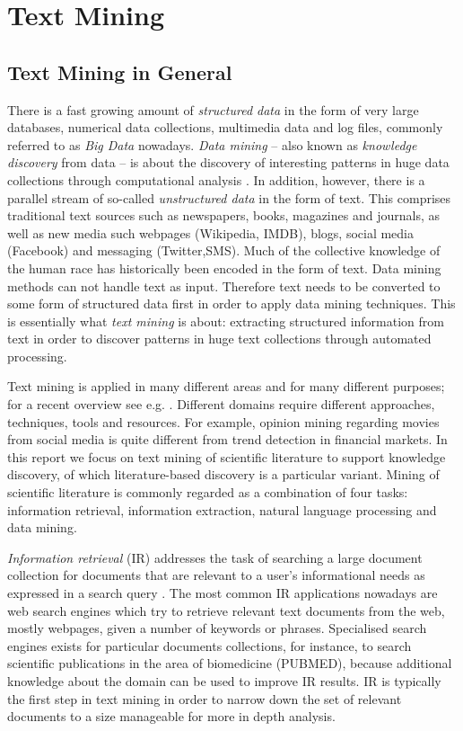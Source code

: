 
\chapter{Text Mining}

\section{Text Mining in General}

There is a fast growing amount of \emph{structured data} in the form of very large databases, numerical data collections, multimedia data and log files, commonly referred to as \emph{Big Data} nowadays.
\emph{Data mining} -- also known as \emph{knowledge discovery} from data -- is about the discovery of interesting patterns in huge data collections through computational analysis \citep{han2006data}.
In addition, however, there is a parallel stream of so-called \emph{unstructured data} in the form of text.
This comprises traditional text sources such as newspapers, books, magazines and journals, as well as new media such webpages (Wikipedia, IMDB), blogs, social media (Facebook) and messaging (Twitter,SMS).
Much of the collective knowledge of the human race has historically been encoded in the form of text. 
Data mining methods can not handle text as input.
Therefore text needs to be converted to some form of structured data first in order to apply data mining techniques.
This is essentially what \emph{text mining} is about: extracting structured information from text in order to discover patterns in huge text collections through automated processing.

Text mining is applied in many different areas and for many different purposes; for a recent overview see e.g. \citep{Aggarwal2012Mining,Weiss2012Fundamentals}.
Different domains require different approaches, techniques, tools and resources.
For example, opinion mining regarding movies from social media is quite different from trend detection in financial markets. 
In this report we focus on text mining of scientific literature to support knowledge discovery, of which literature-based discovery is a particular variant.
Mining of scientific literature is commonly regarded as a combination of four tasks: information retrieval, information extraction, natural language processing and data mining.

\emph{Information retrieval} (IR) addresses the task of searching a large document collection for documents that are relevant to a user's informational needs as expressed in a search query \citep{ManningRaghavanSchutze:08}. 
The most common IR applications nowadays are web search engines which try to retrieve relevant text documents from the web, mostly webpages, given a number of keywords or phrases.
Specialised search engines exists for particular documents collections, for instance, to search scientific publications in the area of biomedicine (PUBMED), because additional knowledge about the domain can be used to improve IR results.
IR is typically the first step in text mining in order to narrow down the set of relevant documents to a size manageable for more in depth analysis.

